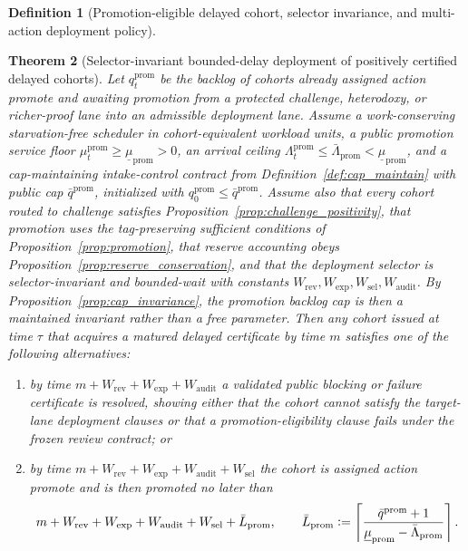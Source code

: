 \documentclass[11pt]{article}
\newtheorem{theorem}{Theorem}[section]
\theoremstyle{definition}
\newtheorem{definition}[theorem]{Definition}
\newcommand{\1}{\mathbf{1}}
\newcommand{\Defeq}{\vcentcolon=}
\begin{document}
\begin{definition}[Promotion-eligible delayed cohort, selector invariance, and multi-action deployment policy]
\end{definition}

\begin{theorem}[Selector-invariant bounded-delay deployment of positively certified delayed cohorts]\label{thm:promotion_liveness}
Let $q_t^{\mathrm{prom}}$ be the backlog of cohorts already assigned action \textsf{promote} and awaiting promotion from a protected challenge, heterodoxy, or richer-proof lane into an admissible deployment lane. Assume a work-conserving starvation-free scheduler in cohort-equivalent workload units, a public promotion service floor $\mu_t^{\mathrm{prom}}\ge \underline\mu_{\mathrm{prom}}>0$, an arrival ceiling $\Lambda_t^{\mathrm{prom}}\le \bar\Lambda_{\mathrm{prom}}<\underline\mu_{\mathrm{prom}}$, and a cap-maintaining intake-control contract from Definition~\ref{def:cap_maintain} with public cap $\bar q^{\mathrm{prom}}$, initialized with $q_0^{\mathrm{prom}}\le \bar q^{\mathrm{prom}}$. Assume also that every cohort routed to challenge satisfies Proposition~\ref{prop:challenge_positivity}, that promotion uses the tag-preserving sufficient conditions of Proposition~\ref{prop:promotion}, that reserve accounting obeys Proposition~\ref{prop:reserve_conservation}, and that the deployment selector is selector-invariant and bounded-wait with constants $W_{\mathrm{rev}},W_{\mathrm{exp}},W_{\mathrm{sel}},W_{\mathrm{audit}}$. By Proposition~\ref{prop:cap_invariance}, the promotion backlog cap is then a maintained invariant rather than a free parameter. Then any cohort issued at time $\tau$ that acquires a matured delayed certificate by time $m$ satisfies one of the following alternatives:
\begin{enumerate}[label=(\roman*), leftmargin=2em]
  \item by time $m+W_{\mathrm{rev}}+W_{\mathrm{exp}}+W_{\mathrm{audit}}$ a validated public blocking or failure certificate is resolved, showing either that the cohort cannot satisfy the target-lane deployment clauses or that a promotion-eligibility clause fails under the frozen review contract; or
  \item by time $m+W_{\mathrm{rev}}+W_{\mathrm{exp}}+W_{\mathrm{audit}}+W_{\mathrm{sel}}$ the cohort is assigned action \textsf{promote} and is then promoted no later than
\[
 m+W_{\mathrm{rev}}+W_{\mathrm{exp}}+W_{\mathrm{audit}}+W_{\mathrm{sel}}+\bar L_{\mathrm{prom}},\qquad\bar L_{\mathrm{prom}}\Defeq\left\lceil \frac{\bar q^{\mathrm{prom}}+1}{\underline\mu_{\mathrm{prom}}-\bar\Lambda_{\mathrm{prom}}} \right\rceil.
\]
\end{enumerate}

\end{theorem}
\end{document}
